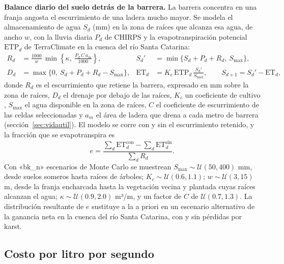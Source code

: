 \textbf{Balance diario del suelo detrás de la barrera.} La barrera concentra en una franja angosta el escurrimiento de una ladera mucho mayor. Se modela el almacenamiento de agua $S_d$ (mm) en la zona de raíces que alcanza esa agua, de ancho $w$, con la lluvia diaria $P_d$ de CHIRPS y la evapotranspiración potencial $\text{ETP}_d$ de TerraClimate en la cuenca del río Santa Catarina:
\begin{equation}
\begin{aligned}
R_d&=\frac{1000}{w}\,\min\!\left\{\kappa,\ \frac{P_d\,C\,a_m}{1000}\right\}, &
S_d'&=\min\{S_d+P_d+R_d,\ S_{\max}\},\\
D_d&=\max\{0,\ S_d+P_d+R_d-S_{\max}\}, &
\text{ET}_d&=K_c\,\text{ETP}_d\,\frac{S_d'}{S_{\max}},\qquad S_{d+1}=S_d'-\text{ET}_d,
\end{aligned}
\end{equation}
donde $R_d$ es el escurrimiento que retiene la barrera, expresado en mm sobre la zona de raíces, $D_d$ el drenaje por debajo de las raíces, $K_c$ un coeficiente de cultivo , $S_{\max}$ el agua disponible en la zona de raíces, $C$ el coeficiente de escurrimiento de las celdas seleccionadas y $a_m$ el área de ladera que drena a cada metro de barrera (sección~\ref{sec:vidautil}). El modelo se corre con y sin el escurrimiento retenido, y la fracción que se evapotranspira es
\begin{equation}
e=\frac{\sum_d \text{ET}_d^{\text{con}}-\sum_d \text{ET}_d^{\text{sin}}}{\sum_d R_d}.
\end{equation}
Con «bk_n» escenarios de Monte Carlo se muestrean $S_{\max}\sim\mathcal U(50,400)$ mm, desde suelos someros hasta raíces de árboles; $K_c\sim\mathcal U(0.6,1.1)$; $w\sim\mathcal U(3,15)$ m, desde la franja encharcada hasta la vegetación vecina y plantada cuyas raíces alcanzan el agua; $\kappa\sim\mathcal U(0.9,2.0)$ m³/m, y un factor de $C$ de $\mathcal U(0.7,1.3)$. La distribución resultante de $e$ sustituye a la a priori en un escenario alternativo de la ganancia neta en la cuenca del río Santa Catarina, con y sin pérdidas por karst.

\subsection{Costo por litro por segundo}\label{sec:costo}

